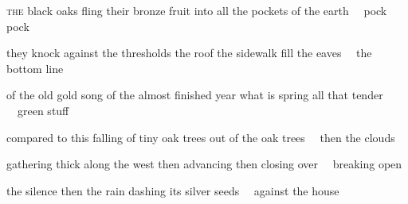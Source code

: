 \begin{poem}
\begin{stanza}
\textsc{the} black oaks\verseline
fling their bronze fruit\verseline
into all the pockets of the earth\verseline
~~pock pock
\end{stanza}

\begin{stanza}
they knock against the thresholds\verseline
the roof the sidewalk\verseline
fill the eaves\verseline
~~the bottom line
\end{stanza}

\begin{stanza}
of the old gold song\verseline
of the almost finished year\verseline
what is spring all that tender\verseline
~~green stuff
\end{stanza}

\begin{stanza}
compared to this\verseline
falling of tiny oak trees\verseline
out of the oak trees\verseline
~~then the clouds
\end{stanza}

\begin{stanza}
gathering thick along the west\verseline
then advancing\verseline
then closing over\verseline
~~breaking open
\end{stanza}

\begin{stanza}
the silence\verseline
then the rain\verseline
dashing its silver seeds\verseline
~~against the house
\end{stanza}
\end{poem}

\newpage %



